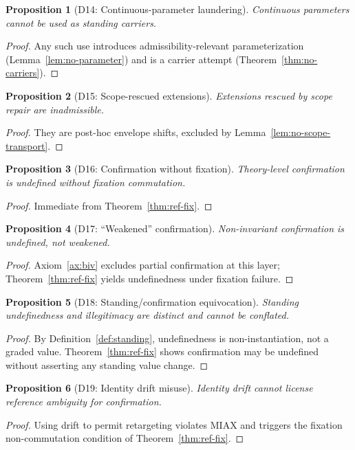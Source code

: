 \documentclass[12pt]{article}
\newtheorem{proposition}{Proposition}
\begin{document}
\begin{proposition}[D14: Continuous-parameter laundering]
Continuous parameters cannot be used as standing carriers.
\end{proposition}
\begin{proof}
Any such use introduces admissibility-relevant parameterization (Lemma~\ref{lem:no-parameter}) and is a carrier attempt (Theorem~\ref{thm:no-carriers}). \end{proof}

\begin{proposition}[D15: Scope-rescued extensions]
Extensions rescued by scope repair are inadmissible.
\end{proposition}
\begin{proof}
They are post-hoc envelope shifts, excluded by Lemma~\ref{lem:no-scope-transport}. \end{proof}

\begin{proposition}[D16: Confirmation without fixation]
Theory-level confirmation is undefined without fixation commutation.
\end{proposition}
\begin{proof}
Immediate from Theorem~\ref{thm:ref-fix}. \end{proof}

\begin{proposition}[D17: ``Weakened'' confirmation]
Non-invariant confirmation is undefined, not weakened.
\end{proposition}
\begin{proof}
Axiom~\ref{ax:biv} excludes partial confirmation at this layer; Theorem~\ref{thm:ref-fix} yields undefinedness under fixation failure. \end{proof}

\begin{proposition}[D18: Standing/confirmation equivocation]
Standing undefinedness and illegitimacy are distinct and cannot be conflated.
\end{proposition}
\begin{proof}
By Definition~\ref{def:standing}, undefinedness is non-instantiation, not a graded value. Theorem~\ref{thm:ref-fix} shows confirmation may be undefined without asserting any standing value change. \end{proof}

\begin{proposition}[D19: Identity drift misuse]
Identity drift cannot license reference ambiguity for confirmation.
\end{proposition}
\begin{proof}
Using drift to permit retargeting violates MIAX and triggers the fixation non-commutation condition of Theorem~\ref{thm:ref-fix}. \end{proof}
\end{document}
